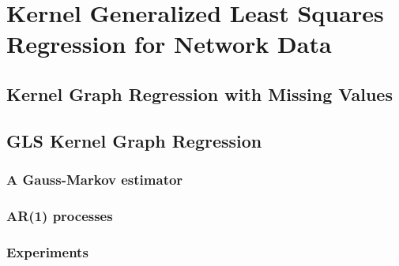 \chapter{Kernel Generalized Least Squares Regression for Network Data} %

\label{chap:gls_kgr} %



\section{Kernel Graph Regression with Missing Values}

\section{GLS Kernel Graph Regression}

\subsection{A Gauss-Markov estimator}

\subsection{AR(1) processes}

\subsection{Experiments}



